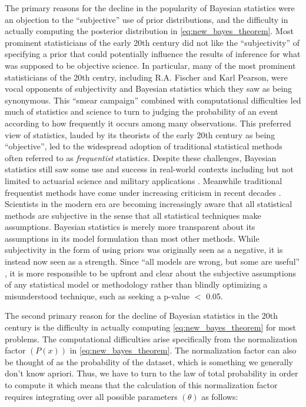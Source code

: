 The primary reasons for the decline in the popularity of Bayesian statistics were an objection to the ``subjective'' use of prior distributions, and the difficulty in actually computing the posterior distribution in \ref{eq:new_bayes_theorem}. Most prominent statisticians of the early 20th century did not like the ``subjectivity'' of specifying a prior that could potentially influence the results of inference for what was supposed to be objective science. In particular, many of the most prominent statisticians of the 20th centry, including R.A. Fischer and Karl Pearson, were vocal opponents of subjectivity and Bayesian statistics which they saw as being synonymous. This ``smear campaign'' combined with computational difficulties led much of statistics and science to turn to judging the probability of an event according to how frequently it occurs among many observations. This preferred view of statistics, lauded by its theorists of the early 20th century as being ``objective'', led to the widespread adoption of traditional statistical methods often referred to as \textit{frequentist} statistics. Despite these challenges, Bayesian statistics still saw some use and success in real-world contexts including but not limited to actuarial science and military applications \cite{McGrayne2011}. Meanwhile traditional frequentist methods have come under increasing criticism in recent decades \cite{Ioannidis2005} \cite{Begley2015}. Scientists in the modern era are becoming increasingly aware that all statistical methods are subjective in the sense that all statistical techniques make assumptions. Bayesian statistics is merely more transparent about its assumptions in its model formulation than most other methods. While subjectivity in the form of using priors was originally seen as a negative, it is instead now seen as a strength. Since ``all models are wrong, but some are useful'' \cite{Box1976}, it is more responsible to be upfront and clear about the subjective assumptions of any statistical model or methodology rather than blindly optimizing a misunderstood technique, such as seeking a p-value $<$ 0.05.

The second primary reason for the decline of Bayesian statistics in the 20th century is the difficulty in actually computing \ref{eq:new_bayes_theorem} for most problems. The computational difficulties arise specifically from the normalization factor $(P(x))$ in \ref{eq:new_bayes_theorem}. The normalization factor can also be thought of as the probability of the dataset, which is something we generally don't know apriori. Thus, we have to turn to the law of total probability in order to compute it which means that the calculation of this normalization factor requires integrating over all possible parameters $(\theta)$ as follows:

